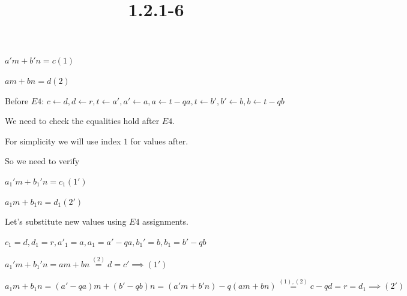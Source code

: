 \documentclass{article}
\title{1.2.1-6}
\begin{document}
\maketitle

$a'm+b'n = c (1)$

$am + bn = d (2)$

Before $E4$: $c \leftarrow d, d \leftarrow r, t \leftarrow a', a' \leftarrow a, a \leftarrow t - qa, t \leftarrow b', b' \leftarrow b, b \leftarrow t - qb$

We need to check the equalities hold after $E4$.

For simplicity we will use index $1$ for values after.

So we need to verify

$a_1'm+b_1'n = c_1 (1')$

$a_1m + b_1n = d_1 (2')$

Let's substitute new values using $E4$ assignments.

$c_1=d, d_1=r, a'_1=a,a_1=a'-qa,b_1'=b,b_1=b'-qb$

$a_1'm+b_1'n=am+bn\overset{(2)}{=}d=c' \implies (1')$

$a_1m+b_1n=(a'-qa)m+(b'-qb)n=(a'm+b'n)-q(am+bn)\overset{(1), (2)}{=}c-qd = r = d_1 \implies (2')$
\end{document}

